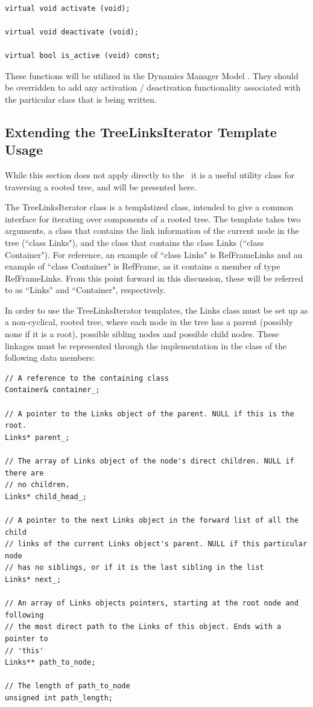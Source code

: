 \begin{verbatim}

virtual void activate (void);

virtual void deactivate (void);

virtual bool is_active (void) const;
\end{verbatim}

These functions will be utilized in the Dynamics Manager Model
\cite{dynenv:DYNMANAGER}. They should be overridden to add any
activation / deactivation functionality associated with the particular class
that is being written.

\subsection{Extending the TreeLinksIterator Template Usage}

While this section does not apply directly to the \, it is
a useful utility class for traversing a rooted tree, and will
be presented here.

The TreeLinksIterator class is a templatized class, intended to give a common
interface for iterating over components of a rooted tree. The template takes
two arguments, a class that contains the link information of the current
node in the tree (``class Links"), and the class that contains ths class Links
(``class Container"). For reference, an example of ``class Links" is RefFrameLinks
and an example of ``class Container" is RefFrame, as it contains a member
of type RefFrameLinks. From this point forward in this discussion, these
will be referred to as ``Links" and ``Container", respectively.

In order to use the TreeLinksIterator templates, the Links class
must be set up as a non-cyclical,
rooted tree, where each node in the tree has a parent
(possibly none if it is a root), possible sibling nodes and possible child
nodes. These linkages must be represented through the implementation in the
class of the following data members:

\begin{verbatim}
// A reference to the containing class
Container& container_;

// A pointer to the Links object of the parent. NULL if this is the root.
Links* parent_;

// The array of Links object of the node's direct children. NULL if there are
// no children.
Links* child_head_;

// A pointer to the next Links object in the forward list of all the child
// links of the current Links object's parent. NULL if this particular node
// has no siblings, or if it is the last sibling in the list
Links* next_;

// An array of Links objects pointers, starting at the root node and following
// the most direct path to the Links of this object. Ends with a pointer to
// 'this'
Links** path_to_node;

// The length of path_to_node
unsigned int path_length;
\end{verbatim}

